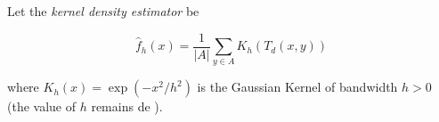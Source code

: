 Let the \textit{ kernel density estimator} be

\[   \hat{f}_h(x) = \frac{1}{|A|}\sum_{ y \in A} K_h (T_d(x,y))  \]

 where $K_h(x) = \exp( -x^2/h^2)$ is the Gaussian Kernel of bandwidth $h>0$ (the value of $h$ remains de ).

